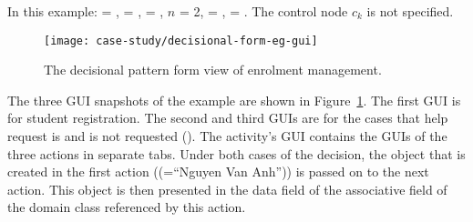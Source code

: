 In this example:  = ,  = ,  = , $ n $ = 2,  = ,  = .
The control node $ c_k $ is not specified.

\begin{figure}[ht]
	\begin{center}
		\texttt{[image: case-study/decisional-form-eg-gui]}
	\end{center}
	\caption{The decisional pattern form view of enrolment management.} %
	\label{fig:decisional-form-eg-gui}
\end{figure}

The three GUI snapshots of the example are shown in Figure~\ref{fig:decisional-form-eg-gui}. The first GUI is for student registration. The second and third GUIs are for the cases that help request is and is not requested (\resp).
The activity's GUI contains the GUIs of the three actions in separate tabs. Under both cases of the decision, the  object that is created in the first action (\eg {}(=``Nguyen Van Anh'')) is passed on to the next action. This object is then presented in the data field of the associative field  of the domain class referenced by this action.
%
%
